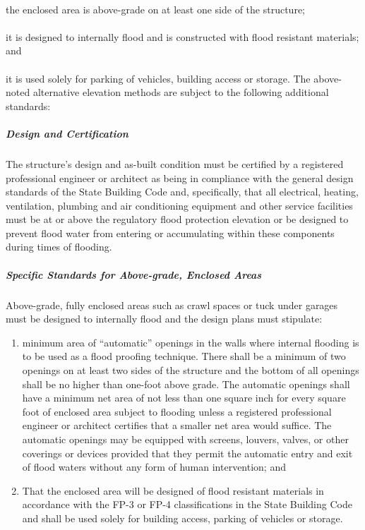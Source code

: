 \paragraph{}
the enclosed area is above-grade on at least one side of the structure;
\paragraph{}
it is designed to internally flood and is constructed with flood resistant materials; and
\paragraph{}
it is used solely for parking of vehicles, building access or storage. The above-noted alternative elevation methods are subject to the following additional standards:
\subparagraph{Design and Certification}
The structure's design and as-built condition must be certified by a registered professional engineer or architect as being in compliance with the general design standards of the State Building Code and, specifically, that all electrical, heating, ventilation, plumbing and air conditioning equipment and other service facilities must be at or above the regulatory flood protection elevation or be designed to prevent flood water from entering or accumulating within these components during times of flooding.
\subparagraph{Specific Standards for Above-grade, Enclosed Areas}
Above-grade, fully enclosed areas such as crawl spaces or tuck under garages must be designed to internally flood and the design plans must stipulate:
\begin{enumerate}[{\indent}a)]
    \item minimum area of “automatic” openings in the walls where internal flooding is to be used as a flood proofing technique. There shall be a minimum of two openings on at least two sides of the structure and the bottom of all openings shall be no higher than one-foot above grade. The automatic openings shall have a minimum net area of not less than one square inch for every square foot of enclosed area subject to flooding unless a registered professional engineer or architect certifies that a smaller net area would suffice. The automatic openings may be equipped with screens, louvers, valves, or other coverings or devices provided that they permit the automatic entry and exit of flood waters without any form of human intervention; and
    \item That the enclosed area will be designed of flood resistant materials in accordance with the FP-3 or FP-4 classifications in the State Building Code and shall be used solely for building access, parking of vehicles or storage.
\end{enumerate}
